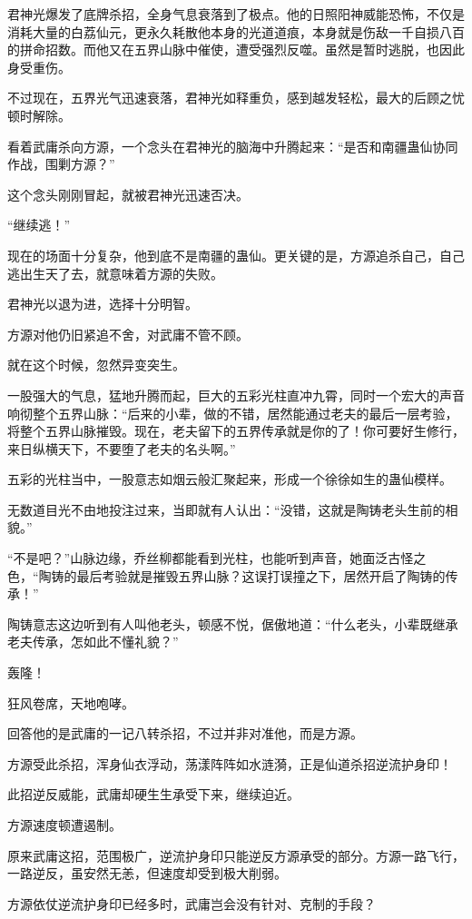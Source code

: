 \begin{this_body}
君神光爆发了底牌杀招，全身气息衰落到了极点。他的日照阳神威能恐怖，不仅是消耗大量的白荔仙元，更永久耗散他本身的光道道痕，本身就是伤敌一千自损八百的拼命招数。而他又在五界山脉中催使，遭受强烈反噬。虽然是暂时逃脱，也因此身受重伤。

不过现在，五界光气迅速衰落，君神光如释重负，感到越发轻松，最大的后顾之忧顿时解除。

看着武庸杀向方源，一个念头在君神光的脑海中升腾起来：“是否和南疆蛊仙协同作战，围剿方源？”

这个念头刚刚冒起，就被君神光迅速否决。

“继续逃！”

现在的场面十分复杂，他到底不是南疆的蛊仙。更关键的是，方源追杀自己，自己逃出生天了去，就意味着方源的失败。

君神光以退为进，选择十分明智。

方源对他仍旧紧追不舍，对武庸不管不顾。

就在这个时候，忽然异变突生。

一股强大的气息，猛地升腾而起，巨大的五彩光柱直冲九霄，同时一个宏大的声音响彻整个五界山脉：“后来的小辈，做的不错，居然能通过老夫的最后一层考验，将整个五界山脉摧毁。现在，老夫留下的五界传承就是你的了！你可要好生修行，来日纵横天下，不要堕了老夫的名头啊。”

五彩的光柱当中，一股意志如烟云般汇聚起来，形成一个徐徐如生的蛊仙模样。

无数道目光不由地投注过来，当即就有人认出：“没错，这就是陶铸老头生前的相貌。”

“不是吧？”山脉边缘，乔丝柳都能看到光柱，也能听到声音，她面泛古怪之色，“陶铸的最后考验就是摧毁五界山脉？这误打误撞之下，居然开启了陶铸的传承！”

陶铸意志这边听到有人叫他老头，顿感不悦，倨傲地道：“什么老头，小辈既继承老夫传承，怎如此不懂礼貌？”

轰隆！

狂风卷席，天地咆哮。

回答他的是武庸的一记八转杀招，不过并非对准他，而是方源。

方源受此杀招，浑身仙衣浮动，荡漾阵阵如水涟漪，正是仙道杀招逆流护身印！

此招逆反威能，武庸却硬生生承受下来，继续迫近。

方源速度顿遭遏制。

原来武庸这招，范围极广，逆流护身印只能逆反方源承受的部分。方源一路飞行，一路逆反，虽安然无恙，但速度却受到极大削弱。

方源依仗逆流护身印已经多时，武庸岂会没有针对、克制的手段？


\end{this_body}
